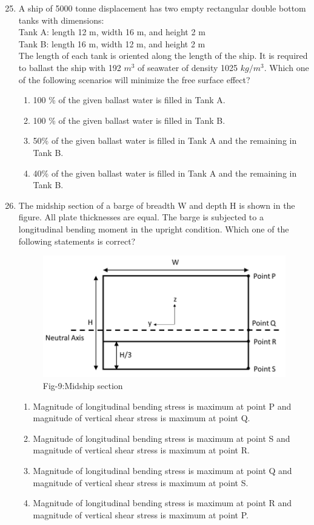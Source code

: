 \documentclass[journal]{IEEEtran}
\theoremstyle{remark}
\begin{document}
\begin{enumerate}[itemsep=1em]
\setcounter{enumi}{24}
\item A ship of 5000 tonne displacement has two empty rectangular double bottom tanks with dimensions:\\
Tank A: length 12 m, width 16 m, and height 2 m\\
Tank B: length 16 m, width 12 m, and height 2 m\\
The length of each tank is oriented along the length of the ship. It is required to ballast the ship with 192 $m^3$ of seawater of density 1025 $kg/m^3$. Which one of the following scenarios will minimize the free surface effect?
\begin{enumerate}[leftmargin=2.5em, labelsep=0.5em, itemsep=0.5em]
   \item 100 \% of the given ballast water is filled in Tank A.
   \item 100 \% of the given ballast water is filled in Tank B.
   \item 50\% of the given ballast water is filled in Tank A and the remaining in Tank B.
   \item 40\% of the given ballast water is filled in Tank A and the remaining in Tank B.
\end{enumerate}
\end{enumerate}

\begin{enumerate}[itemsep=1em]
\setcounter{enumi}{25}
\item The midship section of a barge of breadth W and depth H is shown in the figure. All plate thicknesses are equal. The barge is subjected to a longitudinal bending moment in the upright condition. Which one of the following statements is correct?
\begin{figure}[H]
    \centering
    \includegraphics[width=0.4\columnwidth]{figs/fig-9.jpeg}
    \caption*{Fig-9:Midship section}
    \label{fig:9}
\end{figure}
\begin{enumerate}[leftmargin=2.5em, labelsep=0.5em, itemsep=0.5em]
    \item Magnitude of longitudinal bending stress is maximum at point P and magnitude of vertical shear stress is maximum at point Q.
    \item Magnitude of longitudinal bending stress is maximum at point S and magnitude of vertical shear stress is maximum at point R.
    \item Magnitude of longitudinal bending stress is maximum at point Q and magnitude of vertical shear stress is maximum at point S.
    \item Magnitude of longitudinal bending stress is maximum at point R and magnitude of vertical shear stress is maximum at point P.
\end{enumerate}
\end{enumerate}
\newpage
\vspace*{0.25cm}
\end{document}
